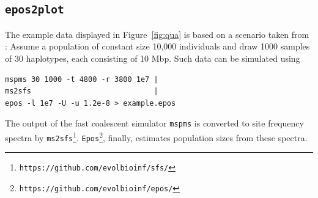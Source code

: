 \documentclass[a4paper]{article}
\newcommand{\ty}{\texttt}
\begin{document}
\subsection{\ty{epos2plot}}
The example data displayed in Figure~\ref{fig:qua} is based on a
scenario taken from \citep[Figure 2a]{liu15:exp}: Assume a population
of constant size 10,000 individuals and draw 1000 samples of 30
haplotypes, each consisting of 10 Mbp. Such data can be simulated using
\begin{verbatim}
mspms 30 1000 -t 4800 -r 3800 1e7 |
ms2sfs                            |
epos -l 1e7 -U -u 1.2e-8 > example.epos
\end{verbatim}
The output of the fast coalescent simulator \ty{mspms} \citep{kel16:eff} is
converted to site frequency spectra by
\ty{ms2sfs}\footnote{\ty{https://github.com/evolbioinf/sfs/}}. \ty{Epos}\footnote{\ty{https://github.com/evolbioinf/epos/}},
finally, estimates population sizes from these spectra.
\end{document}
